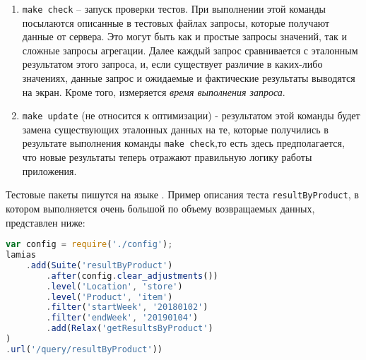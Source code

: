 \begin{enumerate}
  \item \lstinline{make check} – запуск проверки тестов. При выполнении этой команды посылаются описанные в тестовых файлах запросы, которые получают данные от сервера. Это могут быть как и простые запросы значений, так и сложные запросы агрегации. Далее каждый запрос сравнивается с эталонным результатом этого запроса, и, если существует различие в каких-либо значениях, данные запрос и ожидаемые и фактические результаты выводятся на экран. Кроме того, измеряется \emph{время выполнения запроса}.
  \item \lstinline{make update} (не относится к оптимизации) - результатом этой команды будет замена существующих эталонных данных на те, которые получились в результате выполнения команды \lstinline{make check},то есть здесь предполагается, что новые результаты теперь отражают правильную логику работы приложения.
\end{enumerate}

Тестовые пакеты пишутся на языке \js. Пример описания теста \lstinline{resultByProduct}, в котором выполняется очень большой по объему возвращаемых данных, представлен ниже:

\begin{lstlisting}[language=Javascript]
var config = require('./config');
lamias
    .add(Suite('resultByProduct')
        .after(config.clear_adjustments())
        .level('Location', 'store')
        .level('Product', 'item')
        .filter('startWeek', '20180102')
        .filter('endWeek', '20190104')
        .add(Relax('getResultsByProduct')
)
.url('/query/resultByProduct'))
\end{lstlisting}
